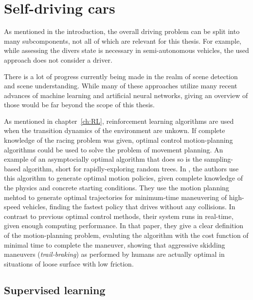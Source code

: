 \section{Self-driving cars}

As mentioned in the introduction, the overall driving problem can be split into many subcomponents, not all of which are relevant for this thesis. For example, while assessing the divers state is necessary in semi-autonomous vehicles, the used approach does not consider a driver. 

There is a lot of progress currently being made in the realm of scene detection and scene understanding. While many of these approaches utilize many recent advances of machine learning and artificial neural networks, giving an overview of those would be far beyond the scope of this thesis.

As mentioned in chapter~\ref{ch:RL}, reinforcement learning algorithms are used when the transition dynamics of the environment are unkown. If complete knowledge of the racing problem was given, optimal control motion-planning algorithms could be used to solve the problem of movement planning. An example of an asymptocially optimal algorithm that does so is the sampling-based  algorithm, short for rapidly-exploring random trees. In \cite{hwan_jeon_anytime_2011}, the authors use this algorithm to generate optimal motion policies, given complete knowledge of the physics and concrete starting conditions. They use the motion planning mehtod to generate optimal trajectories for minimum-time maneuvering of high-speed vehicles, finding the fastest policy that drives without any collisions. In contrast to previous optimal control methods, their system runs in real-time, given enough computing performance. In that paper, they give a clear definition of the motion-planning problem, evaluting the algorithm with the cost function of minimal time to complete the maneuver, showing that aggressive skidding maneuvers (\textit{trail-braking}) as performed by humans are actually optimal in situations of loose surface with low friction.

\subsection{Supervised learning}

